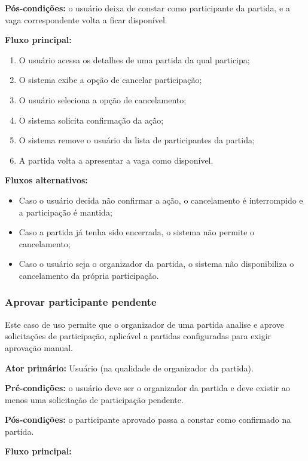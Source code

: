 \documentclass[a4paper, 12pt]{article}
\begin{document}
\begin{justify}
\textbf{Pós-condições:} o usuário deixa de constar como participante da partida, e a vaga correspondente volta a ficar disponível.

\textbf{Fluxo principal:}

\begin{enumerate}
    \item O usuário acessa os detalhes de uma partida da qual participa;
    \item O sistema exibe a opção de cancelar participação;
    \item O usuário seleciona a opção de cancelamento;
    \item O sistema solicita confirmação da ação;
    \item O sistema remove o usuário da lista de participantes da partida;
    \item A partida volta a apresentar a vaga como disponível.
\end{enumerate}

\textbf{Fluxos alternativos:}

\begin{itemize}
    \item Caso o usuário decida não confirmar a ação, o cancelamento é interrompido e a participação é mantida;
    \item Caso a partida já tenha sido encerrada, o sistema não permite o cancelamento;
    \item Caso o usuário seja o organizador da partida, o sistema não disponibiliza o cancelamento da própria participação.
\end{itemize}

\subsubsection{Aprovar participante pendente}

Este caso de uso permite que o organizador de uma partida analise e aprove solicitações de participação, aplicável a partidas configuradas para exigir aprovação manual.

\textbf{Ator primário:} Usuário (na qualidade de organizador da partida).

\textbf{Pré-condições:} o usuário deve ser o organizador da partida e deve existir ao menos uma solicitação de participação pendente.

\textbf{Pós-condições:} o participante aprovado passa a constar como confirmado na partida.

\textbf{Fluxo principal:}


\end{justify}
\end{document}
